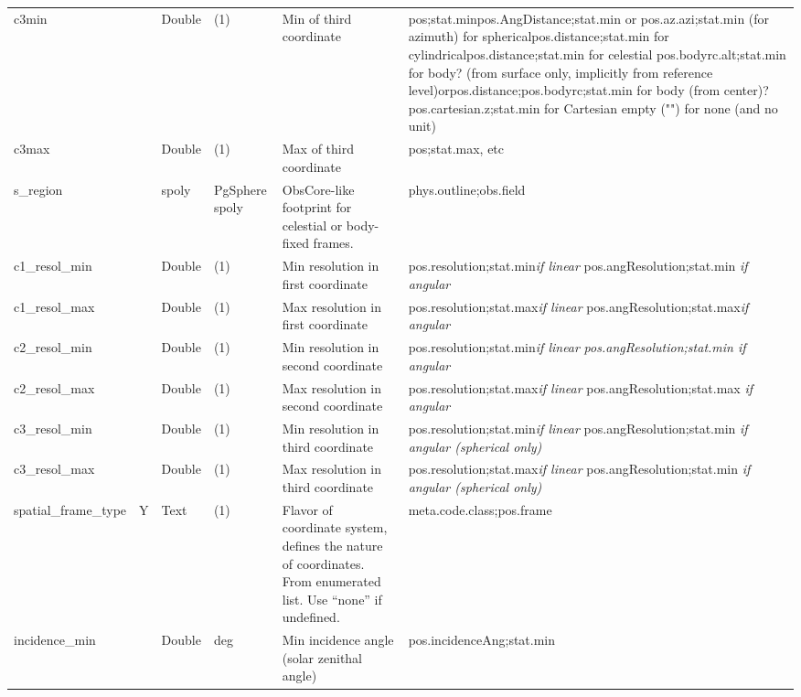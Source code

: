 \documentclass[11pt,a4paper]{ivoa}
\begin{document}
\begin{longtable}{p{3.5cm}p{0.5cm}p{1cm}p{1cm}p{7cm}p{3cm}}
c3min&&Double&(1)&Min of third coordinate&pos;stat.minpos.AngDistance;stat.min or pos.az.azi;stat.min (for azimuth)  for sphericalpos.distance;stat.min  for cylindricalpos.distance;stat.min for celestial pos.bodyrc.alt;stat.min for body? (from surface only, implicitly from reference level)orpos.distance;pos.bodyrc;stat.min for body (from center)?pos.cartesian.z;stat.min for Cartesian empty ("") for none (and no unit)\\

c3max&&Double&(1)&Max of third coordinate&pos;stat.max, etc\\

s\_region&&spoly&PgSphere spoly&ObsCore-like footprint for celestial or body-fixed frames.&phys.outline;obs.field\\

c1\_resol\_min&&Double&(1)&Min resolution in first coordinate&pos.resolution;stat.min\emph{\emph{\emph{if linear} }}pos.angResolution;stat.min \emph{if angular}\\

c1\_resol\_max&&Double&(1)&Max resolution in first coordinate&pos.resolution;stat.max\emph{\emph{\emph{if linear} }}pos.angResolution;stat.max\emph{if angular}\\

c2\_resol\_min&&Double&(1)&Min resolution in second coordinate&pos.resolution;stat.min\emph{\emph{if linear} }\emph{pos.angResolution;stat.min \emph{if angular}}\\

c2\_resol\_max&&Double&(1)&Max resolution in second coordinate&pos.resolution;stat.max\emph{if linear} pos.angResolution;stat.max \emph{\emph{if angular}}\\

c3\_resol\_min&&Double&(1)&Min resolution in third coordinate&pos.resolution;stat.min\emph{if linear} pos.angResolution;stat.min \emph{if angular (spherical only)}\\

c3\_resol\_max&&Double&(1)&Max resolution in third coordinate&pos.resolution;stat.max\emph{if linear}  pos.angResolution;stat.min \emph{\emph{if angular (spherical only)} }\\

spatial\_frame\_type& Y&Text&(1)&Flavor of coordinate system, defines the nature of coordinates. From enumerated list. Use ``none'' if undefined.&meta.code.class;pos.frame\\

incidence\_min&&Double&deg&Min incidence angle (solar zenithal angle)& pos.incidenceAng;stat.min \\


\end{longtable}
\end{document}
